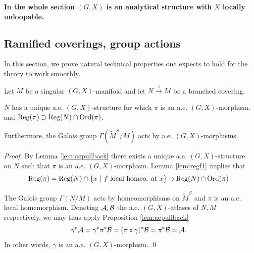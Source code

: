 \textbf{
In the whole section $(G,X)$ is an analytical structure with $X$ locally unloopable.}


% 
% 
%                   

\subsection{Ramified coverings, group actions}

In this section, we prove natural technical properties one expects to hold for the theory to work smoothly.




  \begin{prop}\label{prop:singular_manifold_branched_covering} Let $M$ be a singular $(G,X)$-manifold and let $N\xrightarrow{\pi} M$ be a branched covering.
                    
                    $N$ has a unique a.e. $(G,X)$-structure for which $\pi$ is an a.e. $(G,X)$-morphism.
                    and $\mathrm{Reg}(\pi)\supset\mathrm{Reg}(N)\cap \mathrm{Ord}(\pi)$.
                    
                     Furthermore, the Galois group $\Gamma(\widetilde M^S/M)$ acts by a.e. $(G,X)$-morphisms.
                    \end{prop}
                    \begin{proof}
                        By Lemma \ref{lem:aepullback} there exists a unique a.e. $(G,X)$-structure on $N$ such that
                        $\pi$ is an a.e. $(G,X)$-morphism. Lemma \ref{lem:regf1} implies that $$\mathrm{Reg}(\pi)=\mathrm{Reg}(N)\cap\{x ~|~ f \text{ local homeo. at }x\}\supset \mathrm{Reg}(N)\cap \mathrm{Ord}(\pi)$$
                     
                     The Galois group $\Gamma(N/M)$ acts by homeomorphisms on $\widetilde M^S$ and $\pi$ is an a.e. local homemorphism. Denoting $\mathcal A,\mathcal B$ the a.e. $(G,X)$-atlases of $N,M$ respectively, we may thus apply Proposition \ref{lem:aepullback} 
                     $$\gamma^*\mathcal A = \gamma^* \pi^*\mathcal B=(\pi\circ \gamma)^*\mathcal B = \pi^*\mathcal B = \mathcal A.$$
                     In other words, $\gamma$ is an a.e. $(G,X)$-morphism. 
                    \qed\end{proof}


